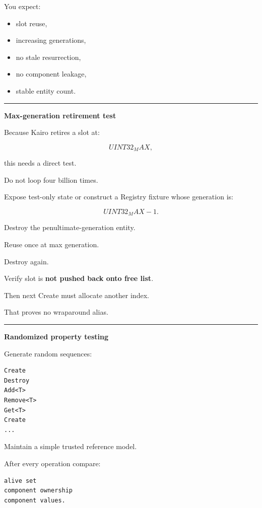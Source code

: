 You expect:

\begin{itemize}
\tightlist
\item
  slot reuse,
\item
  increasing generations,
\item
  no stale resurrection,
\item
  no component leakage,
\item
  stable entity count.
\end{itemize}

\begin{center}\rule{0.5\linewidth}{0.5pt}\end{center}

\textbf{Max-generation retirement test}

Because Kairo retires a slot at:

\[
UINT32_MAX,
\]

this needs a direct test.

Do not loop four billion times.

Expose test-only state or construct a Registry fixture whose generation is:

\[
UINT32_MAX-1.
\]

Destroy the penultimate-generation entity.

Reuse once at max generation.

Destroy again.

Verify slot is \textbf{not pushed back onto free list}.

Then next Create must allocate another index.

That proves no wraparound alias.

\begin{center}\rule{0.5\linewidth}{0.5pt}\end{center}

\textbf{Randomized property testing}

Generate random sequences:

\begin{verbatim}
Create
Destroy
Add<T>
Remove<T>
Get<T>
Create
...
\end{verbatim}

Maintain a simple trusted reference model.

After every operation compare:

\begin{verbatim}
alive set
component ownership
component values.
\end{verbatim}

